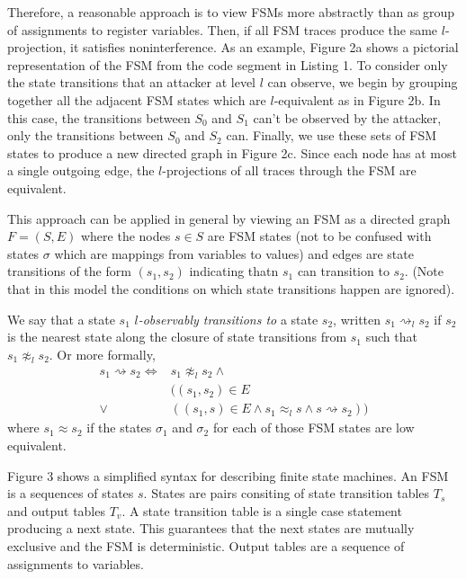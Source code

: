 \documentclass[paper=a4, fontsize=10pt]{scrartcl} %
\begin{document}
Therefore, a reasonable approach is to view FSMs more abstractly than as group 
of assignments to register variables. Then, if all FSM traces produce the same 
$l$-projection, it satisfies noninterference. As an example, Figure 2a shows a 
pictorial representation of the FSM from the code segment in Listing 1. To 
consider only the state transitions that an attacker at level $l$ can observe, 
we begin by grouping together all the adjacent FSM states which are 
$l$-equivalent as in Figure 2b. In this case, the transitions between $S_0$ and 
$S_1$ can't be observed by the attacker, only the transitions between $S_0$ and 
$S_2$ can. Finally, we use these sets of FSM states to produce a new directed 
graph in Figure 2c. Since each node has at most a single outgoing edge, the 
$l$-projections of all traces through the FSM are equivalent.

This approach can be applied in general
by viewing an FSM as a directed graph $F=(S,E)$ where the nodes $s\in S$ are 
FSM states (not to be confused with states $\sigma$ which are mappings from 
variables to values) and edges are state transitions of the form $(s_1,s_2)$ 
indicating thatn $s_1$ can transition to $s_2$. (Note that in this model 
the conditions on which state transitions happen are ignored). 

We say that a state $s_1$ \emph{$l$-observably transitions to} a state $s_2$, 
written $s_1 \rightsquigarrow_l s_2$ if $s_2$ is the nearest state along the 
closure of state transitions from $s_1$ such that $s_1 \not\approx_l s_2$. Or 
more formally,
\begin{align*}
  s_1 \rightsquigarrow s_2 \Longleftrightarrow
    & s_1 \not\approx_l s_2 \wedge \\
    & ((s_1,s_2)\in E \\
    \vee & \left( (s_1,s)\in E \wedge s_1 \approx_l s\wedge s \rightsquigarrow s_2 \right)
    )
\end{align*}
where $s_1 \approx s_2$ if the states $\sigma_1$ and $\sigma_2$ for each of 
those FSM states are low equivalent.




Figure 3 shows a simplified syntax for describing finite state machines. An FSM
is a sequences of states $s$. States are pairs consiting of state transition
tables $T_s$ and output tables $T_v$. A state transition table is a single case
statement producing a next state. This guarantees that the next states are
mutually exclusive and the FSM is deterministic. Output tables are a sequence
of assignments to variables.
\end{document}

